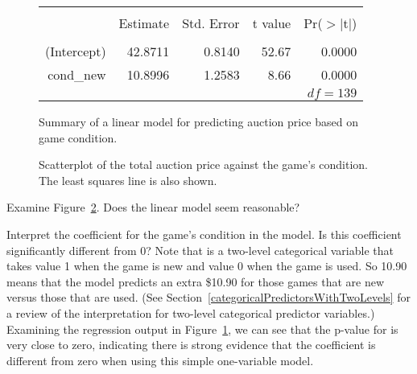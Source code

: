 \begin{figure}[ht]
\centering
\begin{tabular}{rrrrr}
  \hline
  \vspace{-3.7mm} & & & & \\
 & Estimate & Std. Error & t value & Pr($>$$|$t$|$) \\ 
  \hline
  \vspace{-3.8mm} & & & & \\
(Intercept) & 42.8711 & 0.8140 & 52.67 & 0.0000 \\ 
  cond\_\hspace{0.3mm}new & 10.8996 & 1.2583 & 8.66 & 0.0000 \\ 
   \hline
   &&&\multicolumn{2}{r}{$df=139$}
\end{tabular}
\caption{Summary of a linear model for predicting auction price based on game condition.}
\label{singleVarModelsForPriceUsingCond}
\end{figure}

\begin{figure}
  \centering
  \caption{Scatterplot of the total auction price against
      the game's condition.
      The least squares line is also shown.}
  \label{marioKartSingle}
\end{figure}

\begin{exercisewrap}
\begin{nexercise}
Examine Figure~\ref{marioKartSingle}. Does the linear model seem reasonable?\footnotemark
\end{nexercise}
\end{exercisewrap}

\begin{examplewrap}
\begin{nexample}{Interpret the coefficient for the game's condition in the model. Is this coefficient significantly different from 0?}
Note that  is a two-level categorical variable that takes value 1 when the game is new and value 0 when the game is used. So 10.90 means that the model predicts an extra \$10.90 for those games that are new versus those that are used. (See Section~\ref{categoricalPredictorsWithTwoLevels} for a review of the interpretation for two-level categorical predictor variables.) Examining the regression output in Figure~\ref{singleVarModelsForPriceUsingCond}, we can see that the p-value for  is very close to zero, indicating there is strong evidence that the coefficient is different from zero when using this simple one-variable model.
\end{nexample}
\end{examplewrap}

